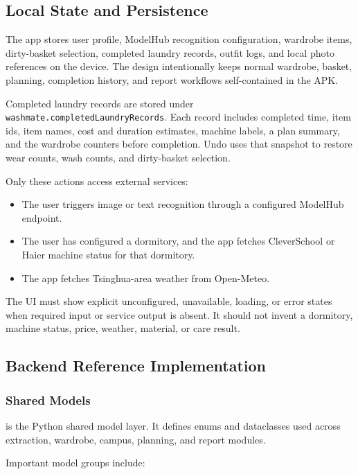\documentclass[11pt,a4paper]{article}
\begin{document}
\subsection{Local State and Persistence}

The app stores user profile, ModelHub recognition configuration, wardrobe items, dirty-basket selection, completed laundry records, outfit logs, and local photo references on the device. The design intentionally keeps normal wardrobe, basket, planning, completion history, and report workflows self-contained in the APK.

Completed laundry records are stored under \texttt{washmate.completedLaundryRecords}. Each record includes completed time, item ids, item names, cost and duration estimates, machine labels, a plan summary, and the wardrobe counters before completion. Undo uses that snapshot to restore wear counts, wash counts, and dirty-basket selection.

Only these actions access external services:

\begin{itemize}
  \item The user triggers image or text recognition through a configured ModelHub endpoint.
  \item The user has configured a dormitory, and the app fetches CleverSchool or Haier machine status for that dormitory.
  \item The app fetches Tsinghua-area weather from Open-Meteo.
\end{itemize}

The UI must show explicit unconfigured, unavailable, loading, or error states when required input or service output is absent. It should not invent a dormitory, machine status, price, weather, material, or care result.

\subsection{Backend Reference Implementation}

\subsubsection{Shared Models}

 is the Python shared model layer. It defines enums and dataclasses used across extraction, wardrobe, campus, planning, and report modules.

Important model groups include:
\end{document}
